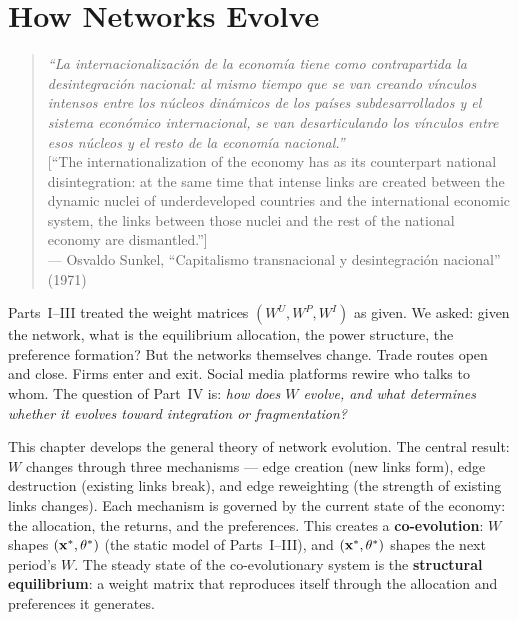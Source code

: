 \documentclass[../structural_economics_book.tex]{subfiles}
\begin{document}
\ifSubfilesClassLoaded{\setcounter{chapter}{12}}{}
\chapter{How Networks Evolve}\label{ch:13}
\begin{quote}
\textit{``La internacionalizaci\'{o}n de la econom\'{i}a tiene como contrapartida la desintegraci\'{o}n nacional: al mismo tiempo que se van creando v\'{i}nculos intensos entre los n\'{u}cleos din\'{a}micos de los pa\'{i}ses subdesarrollados y el sistema econ\'{o}mico internacional, se van desarticulando los v\'{i}nculos entre esos n\'{u}cleos y el resto de la econom\'{i}a nacional.''}\\[0.3em]
\textnormal{[``The internationalization of the economy has as its counterpart national disintegration: at the same time that intense links are created between the dynamic nuclei of underdeveloped countries and the international economic system, the links between those nuclei and the rest of the national economy are dismantled.'']}\\
\hfill --- Osvaldo Sunkel, ``Capitalismo transnacional y desintegraci\'{o}n nacional'' (1971)
\end{quote}
\nocite{sunkel1971capitalismo}

\vspace{1em}

Parts~I--III treated the weight matrices $(W^U, W^P, W^I)$ as given. We asked: given the network, what is the equilibrium allocation, the power structure, the preference formation? But the networks themselves change. Trade routes open and close. Firms enter and exit. Social media platforms rewire who talks to whom. The question of Part~IV is: \textit{how does $W$ evolve, and what determines whether it evolves toward integration or fragmentation?}

This chapter develops the general theory of network evolution. The central result: $W$ changes through three mechanisms --- edge creation (new links form), edge destruction (existing links break), and edge reweighting (the strength of existing links changes). Each mechanism is governed by the current state of the economy: the allocation, the returns, and the preferences. This creates a \textbf{co-evolution}: $W$ shapes $(\mathbf{x}^*, \theta^*)$ (the static model of Parts~I--III), and $(\mathbf{x}^*, \theta^*)$ shapes the next period's $W$. The steady state of the co-evolutionary system is the \textbf{structural equilibrium}: a weight matrix that reproduces itself through the allocation and preferences it generates.
\end{document}
